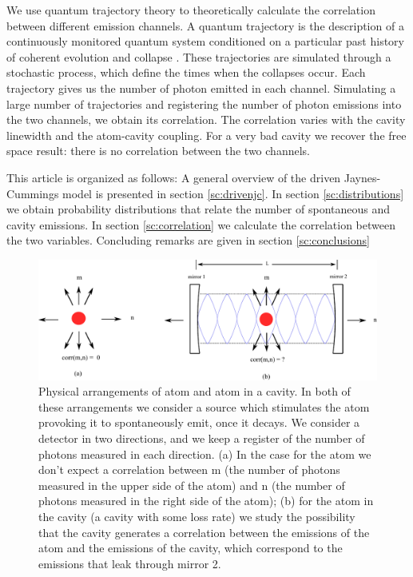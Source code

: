 \documentclass[%
 reprint,
 amsmath,amssymb,
 aps, 
]{revtex4-2}
\begin{document}
We use quantum trajectory theory to theoretically calculate the
correlation between different emission channels. A quantum trajectory
is the description of a continuously monitored quantum system
conditioned on a particular past history of coherent evolution and
collapse \cite{Carmichael1993Open}. These trajectories are simulated
through a stochastic process, which define the times when the
collapses occur. Each trajectory gives us the number of photon emitted
in each channel. Simulating a large number of trajectories and
registering the number of photon emissions into the two channels, we
obtain its correlation. The correlation varies with the cavity
linewidth and the atom-cavity coupling. For a very bad cavity we
recover the free space result: there is no correlation between the two
channels.


This article is organized as follows: A general overview of the driven
Jaynes-Cummings model is presented in section \ref{sc:drivenjc}. In
section \ref{sc:distributions} we obtain probability distributions
that relate the number of spontaneous and cavity emissions. In section
\ref{sc:correlation} we calculate the correlation between the two variables.
Concluding remarks are given in section \ref{sc:conclusions}
\begin{center}
\begin{figure}\label{asa}
\begin{center}
\includegraphics[scale = 0.65]{newimagepaper.pdf}
\caption{\small{Physical arrangements of atom and atom in a cavity. In
    both of these arrangements we consider a source which stimulates
    the atom provoking it to spontaneously emit, once it decays. We
    consider a detector in two directions, and we keep a register of
    the number of photons measured in each direction. (a) In the case
    for the atom we don't expect a correlation between m (the number
    of photons measured in the upper side of the atom) and n (the
    number of photons measured in the right side of the atom); (b) for
    the atom in the cavity (a cavity with some loss rate) we study the
    possibility that the cavity generates a correlation between the
    emissions of the atom and the emissions of the cavity, which
    correspond to the emissions that leak through mirror
    2.}} 
\end{center}
\end{figure}
\end{center}
\end{document}
